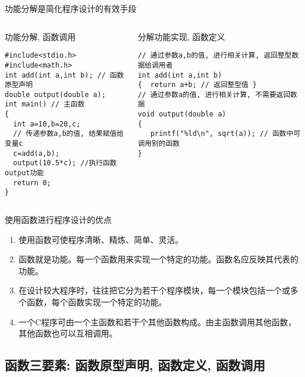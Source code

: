\begin{frame}{功能分解是简化程序设计的有效手段}
\begin{columns}[T]
\begin{beamerboxesrounded}{功能分解, 函数调用}
\begin{lstlisting}
#include<stdio.h>
#include<math.h>
int add(int a,int b); // 函数原型声明
double output(double a);
int main() // 主函数
{
  int a=10,b=20,c;
  // 传递参数a,b的值, 结果赋值给变量c 
  c=add(a,b); 
  output(10.5*c); //执行函数output功能
  return 0; 
}
\end{lstlisting}
\end{beamerboxesrounded}
\begin{beamerboxesrounded}{分解功能实现, 函数定义}
\begin{lstlisting}
// 通过参数a,b的值, 进行相关计算, 返回整型数据给调用者
int add(int a,int b)
{  return a+b; // 返回整型值 }
// 通过参数a的值, 进行相关计算, 不需要返回数据
void output(double a)
{  
   printf("%ld\n", sqrt(a)); // 函数中可调用别的函数
}
\end{lstlisting}
\end{beamerboxesrounded}
\end{columns}
\end{frame}

\begin{frame}{使用函数进行程序设计的优点}
\begin{enumerate}
	\setlength{\itemsep}{.5cm}
	\item 使用函数可使程序清晰、精炼、简单、灵活。
	\item 函数就是功能。每一个函数用来实现一个特定的功能。函数名应反映其代表的功能。
	\item 在设计较大程序时，往往把它分为若干个程序模块，每一个模块包括一个或多个函数，每个函数实现一个特定的功能。
	\item 一个C程序可由一个主函数和若干个其他函数构成。由主函数调用其他函数，其他函数也可以互相调用。	
\end{enumerate}
\end{frame}

\subsection{函数三要素: 函数原型声明, 函数定义, 函数调用}

